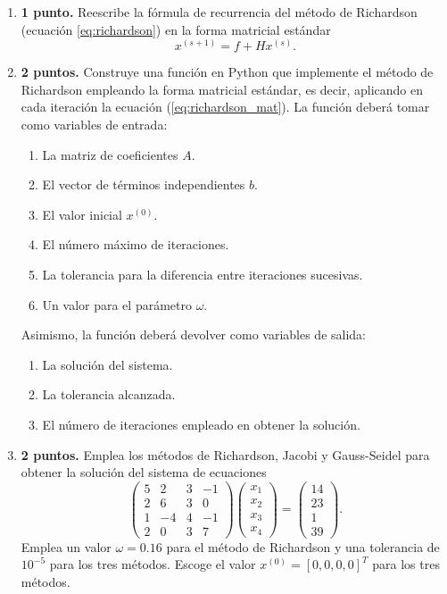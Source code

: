 \begin{enumerate}
\item \textbf{1 punto.} Reescribe la fórmula de recurrencia del método de Richardson (ecuación \ref{eq:richardson}) en la forma matricial estándar
\begin{equation}\label{eq:richardson_mat}
x^{(s+1)} = f + Hx^{(s)}.
\end{equation}

\item \textbf{2 puntos.} Construye una función en Python que implemente el método de Richardson empleando la forma matricial estándar, es decir, aplicando en cada iteración la ecuación (\ref{eq:richardson_mat}). La función deberá tomar como variables de entrada:
\begin{enumerate}
	\item La matriz de coeficientes $A$.
	\item El vector de términos independientes $b$.
	\item El valor inicial $x^{(0)}$.
	\item El número máximo de iteraciones.
	\item La tolerancia para la diferencia entre iteraciones sucesivas.
	\item Un valor para el parámetro $\omega$.
\end{enumerate}
Asimismo, la función deberá devolver como variables de salida:
\begin{enumerate}
\item La solución del sistema.
\item La tolerancia alcanzada.
\item El número de iteraciones empleado en obtener la solución.
\end{enumerate}

\item \textbf{2 puntos.} Emplea los métodos de Richardson, Jacobi y Gauss-Seidel para obtener la solución del sistema de ecuaciones
\begin{equation*}
\begin{pmatrix}
5&2&3&-1\\
2&6&3&0\\
1&-4&4&-1\\
2&0&3&7
\end{pmatrix}\begin{pmatrix}
x_1\\ x_2\\ x_3\\ x_4
\end{pmatrix}= \begin{pmatrix}
14\\ 23\\1\\ 39
\end{pmatrix}.
\end{equation*}
Emplea un valor $\omega = 0.16$ para el método de Richardson y una tolerancia de $10^{-5}$ para los tres métodos. Escoge el valor $x^{(0)}=\left[0,0,0,0\right]^T$ para los tres métodos.


\end{enumerate}

